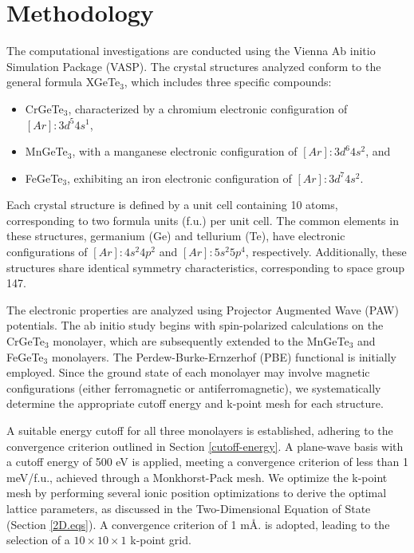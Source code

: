 

\chapter{Methodology} %

\label{Chapter3} %




The computational investigations are conducted using the Vienna Ab initio Simulation Package (VASP). The crystal structures analyzed conform to the general formula XGeTe$_{3}$, which includes three specific compounds:  

\begin{itemize}  
	\item CrGeTe$_{3}$, characterized by a chromium electronic configuration of \([Ar]: 3d^5 4s^1\),  
	\item MnGeTe$_{3}$, with a manganese electronic configuration of \([Ar]: 3d^6 4s^2\), and  
	\item FeGeTe$_{3}$, exhibiting an iron electronic configuration of \([Ar]: 3d^7 4s^2\).  
\end{itemize}  

Each crystal structure is defined by a unit cell containing 10 atoms, corresponding to two formula units (f.u.) per unit cell. The common elements in these structures, germanium (Ge) and tellurium (Te), have electronic configurations of \([Ar]: 4s^2 4p^2\) and \([Ar]: 5s^2 5p^4\), respectively. Additionally, these structures share identical symmetry characteristics, corresponding to space group 147.  

The electronic properties are analyzed using Projector Augmented Wave (PAW) potentials. The ab initio study begins with spin-polarized calculations on the CrGeTe$_{3}$ monolayer, which are subsequently extended to the MnGeTe$_{3}$ and FeGeTe$_{3}$ monolayers. The Perdew-Burke-Ernzerhof (PBE) functional is initially employed. Since the ground state of each monolayer may involve magnetic configurations (either ferromagnetic or antiferromagnetic), we systematically determine the appropriate cutoff energy and k-point mesh for each structure.  

A suitable energy cutoff for all three monolayers is established, adhering to the convergence criterion outlined in Section \ref{cutoff-energy}. A plane-wave basis with a cutoff energy of 500 eV is applied, meeting a convergence criterion of less than 1 meV/f.u., achieved through a Monkhorst-Pack mesh. We optimize the k-point mesh by performing several ionic position optimizations to derive the optimal lattice parameters, as discussed in the Two-Dimensional Equation of State (Section \ref{2D.eqs}). A convergence criterion of 1 m\AA. is adopted, leading to the selection of a \(10 \times 10 \times 1\) k-point grid.  

